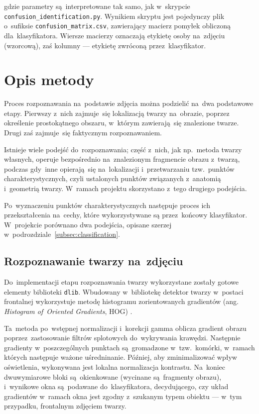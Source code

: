\documentclass[11pt,a4paper]{article}
\begin{document}
gdzie parametry są~interpretowane tak samo, jak w~skrypcie \verb+confusion_identification.py+.
Wynikiem skryptu jest pojedynczy plik o~sufiksie \verb+confusion_matrix.csv+, zawierający macierz pomyłek obliczoną dla~klasyfikatora.
Wiersze macierzy oznaczają etykietę osoby na~zdjęciu (wzorcową), zaś kolumny --- etykietę zwróconą przez~klasyfikator.

\section{Opis metody}

Proces rozpoznawania na~podstawie zdjęcia można podzielić na~dwa podstawowe etapy.
Pierwszy z~nich zajmuje~się lokalizacją twarzy na~obrazie, poprzez określenie prostokątnego obszaru, w~którym zawierają~się znalezione twarze.
Drugi zaś zajmuje~się faktycznym rozpoznawaniem.

Istnieje wiele podejść do~rozpoznawania; część z~nich, jak np.~metoda twarzy własnych, operuje bezpośrednio na~znalezionym fragmencie obrazu z~twarzą, podczas gdy~inne opierają~się na~lokalizacji i~przetwarzaniu tzw.~punktów charakterystycznych, czyli ustalonych punktów związanych z~anatomią i~geometrią twarzy.
W~ramach projektu skorzystano z~tego drugiego podejścia.

Po~wyznaczeniu punktów charakterystycznych następuje proces ich przekształcenia na~cechy, które wykorzystywane są przez~końcowy klasyfikator.
W~projekcie porównano dwa podejścia, opisane szerzej w~podrozdziale~\ref{subsec:classification}.

\subsection{Rozpoznawanie twarzy na~zdjęciu}

Do~implementacji etapu rozpoznawania twarzy wykorzystane zostały gotowe elementy biblioteki \texttt{dlib}.
Wbudowany w~bibliotekę detektor twarzy w~postaci frontalnej wykorzystuje metodę histogramu zorientowanych gradientów (ang. \emph{Histogram of~Oriented Gradients}, HOG) \cite{dalal2005}.

Ta~metoda po~wstępnej normalizacji i~korekcji gamma oblicza gradient obrazu poprzez~zastosowanie filtrów splotowych do~wykrywania krawędzi.
Następnie gradienty w~poszczególnych punktach są~gromadzone w~tzw.~komórki, w~ramach których następuje ważone uśredninanie.
Później, aby zminimalizować wpływ oświetlenia, wykonywana jest lokalna normalizacja kontrastu.
Na~koniec dwuwymiarowe bloki są~okienkowane (wycinane są~fragmenty obrazu), i~wynikowe okna są~podawane do~klasyfikatora, decydującego, czy układ gradientów w~ramach okna jest zgodny z~szukanym typem obiektu --- w~tym przypadku, frontalnym zdjęciem twarzy.
\end{document}
